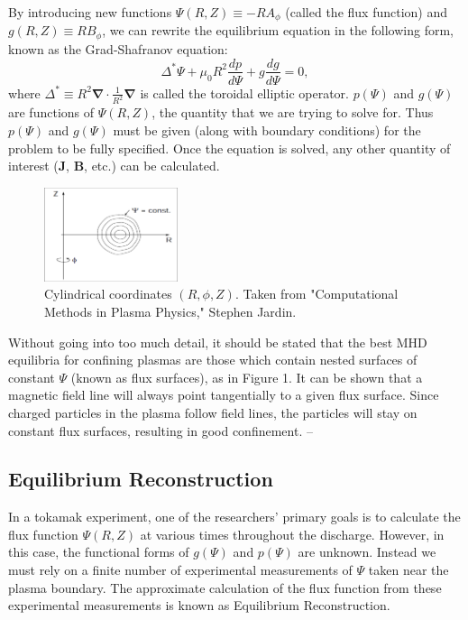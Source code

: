 \documentclass[paper=letter, fontsize=11pt]{scrartcl} %
\begin{document}
By introducing new functions $\Psi(R,Z) \equiv -R A_{\phi}$ (called the flux function) and $g(R,Z) \equiv R B_{\phi}$, we can rewrite the equilibrium equation in the following form, known as the Grad-Shafranov equation:
\begin{equation}
\Delta^{*} \Psi + \mu_0 R^2 \frac{dp}{d\Psi} + g \frac{dg}{d\Psi} = 0,
\end{equation}
where $\Delta^{*} \equiv R^2 \mathbf{\nabla} \cdot \frac{1}{R^2} \mathbf{\nabla}$ is called the toroidal elliptic operator. $p(\Psi)$ and $g(\Psi)$ are functions of $\Psi(R,Z)$, the quantity that we are trying to solve for.  Thus $p(\Psi)$ and $g(\Psi)$ must be given (along with boundary conditions) for the problem to be fully specified.  Once the equation is solved, any other quantity of interest ($\mathbf{J}$, $\mathbf{B}$, etc.) can be calculated.  

\begin{figure}
\centering
\captionsetup{justification=centering,margin=3cm}
\caption[caption]{Cylindrical coordinates $(R,\phi,Z)$.  Taken from "Computational Methods in Plasma Physics," Stephen Jardin.}

\includegraphics[width=0.35\textwidth]{coordinates}

\end{figure}

Without going into too much detail, it should be stated that the best MHD equilibria for confining plasmas are those which contain nested surfaces of constant $\Psi$ (known as flux surfaces), as in Figure 1.  It can be shown that a magnetic field line will always point tangentially to a given flux surface.  Since charged particles in the plasma follow field lines, the particles will stay on constant flux surfaces, resulting in good confinement.    --



\subsection{Equilibrium Reconstruction}

In a tokamak experiment, one of the researchers' primary goals is to calculate the flux function $\Psi(R,Z)$ at various times throughout the discharge.  However, in this case, the functional forms of $g(\Psi)$ and $p(\Psi)$ are unknown.  Instead we must rely on a finite number of experimental measurements of $\Psi$ taken near the plasma boundary.  The approximate calculation of the flux function from these experimental measurements is known as Equilibrium Reconstruction.  
\end{document}
